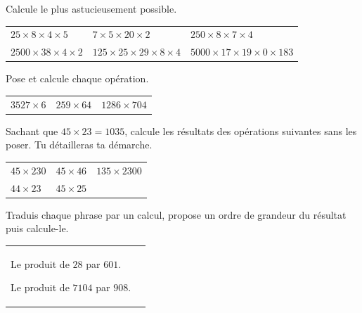 \documentclass[a4paper,10pt]{report}
\begin{document}
\begin{ex}
Calcule le plus astucieusement possible.
\begin{enumerate}
\begin{tabular}{m{5cm}m{5cm}m{5cm}}
\item $25\times 8\times 4\times 5$&
\item $7\times 5\times 20\times 2$&
\item $250\times 8\times 7\times 4$\\
\item $2500\times 38\times 4\times 2$&
\item $125\times 25\times 29\times 8\times 4$&
\item $5000\times 17\times 19\times 0\times 183$\\
\end{tabular}
\end{enumerate}  
\end{ex}

\begin{ex}
Pose et calcule chaque opération.
\begin{enumerate}
\begin{tabular}{m{5cm}m{5cm}m{5cm}}
\item $3527\times 6$&
\item $259\times 64$&
\item $1286\times 704$\\
\end{tabular}
\end{enumerate} 
\end{ex}

\begin{ex}
Sachant que $45\times 23=1035$, calcule les résultats des opérations suivantes sans les poser. Tu détailleras ta démarche.
\begin{enumerate}
\begin{tabular}{m{5cm}m{5cm}m{5cm}}
\item $45\times 230$&
\item $45\times 46$&
\item $135\times 2300$\\
\item $44\times 23$&
\item $45\times 25$&\\
\end{tabular}
\end{enumerate} 
\end{ex}

\begin{ex}
Traduis chaque phrase par un calcul, propose un ordre de grandeur du résultat puis calcule-le.
\begin{enumerate}
\begin{tabular}{m{7cm}m{7cm}}
\item Le produit de $28$ par $601$.
\item Le produit de $7 104$ par $908$.
\end{tabular}
\end{enumerate} 
\end{ex}
\end{document}
